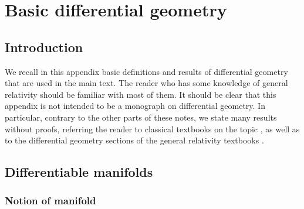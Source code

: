 \chapter{Basic differential geometry} \label{s:bas}

\minitoc

\section{Introduction}

We recall in this appendix basic definitions and results of differential geometry
that are used in the main text.
The reader who has some knowledge of general relativity should be familiar with most of them.
It should be clear that this appendix is not intended to be a monograph on differential geometry.
In particular, contrary to the other parts of these notes, we state many results
without proofs,
referring the reader to classical textbooks on the topic
\cite{Lafon15,Lee13,Lee18,ONeil83,Berge03,ChoquDD77,Eschr11}, as well as
to the differential geometry sections of the general relativity textbooks
\cite{Choqu09,Strau13,Wald84}.


\section{Differentiable manifolds} \label{s:bas:manif}

\subsection{Notion of manifold} \label{s:bas:def_manif}

